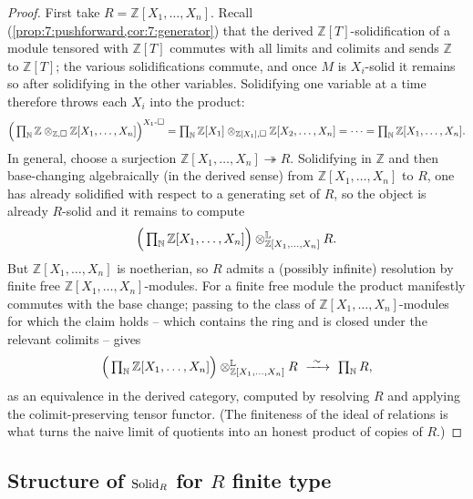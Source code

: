 \begin{proof}
First take $R=\mathbb{Z}[X_{1},\dots,X_{n}]$. Recall (\cref{prop:7:pushforward,cor:7:generator}) that the derived $\mathbb{Z}[T]$-solidification of a module
tensored with $\mathbb{Z}[T]$ commutes with all limits and colimits and sends
$\mathbb{Z}$ to $\mathbb{Z}[T]$; the various solidifications commute, and once
$M$ is $X_{i}$-solid it remains so after solidifying in the other variables.
Solidifying one variable at a time therefore throws each $X_{i}$ into the
product:
\begin{equation*}
\Bigl(\,\textstyle\prod_{\mathbb{N}}\mathbb{Z}\otimes_{\mathbb{Z},\square}
\mathbb{Z}[X_{1},\dots,X_{n}]\Bigr)^{X_{1}\text{-}\square}
=\textstyle\prod_{\mathbb{N}}\mathbb{Z}[X_{1}]\otimes_{\mathbb{Z}[X_{1}],\square}
\mathbb{Z}[X_{2},\dots,X_{n}]=\cdots=\textstyle\prod_{\mathbb{N}}\mathbb{Z}
[X_{1},\dots,X_{n}].
\end{equation*}
In general, choose a surjection $\mathbb{Z}[X_{1},\dots,X_{n}]\twoheadrightarrow
R$. Solidifying in $\mathbb{Z}$ and then base-changing algebraically (in the
derived sense) from $\mathbb{Z}[X_{1},\dots,X_{n}]$ to $R$, one has already
solidified with respect to a generating set of $R$, so the object is already
$R$-solid and it remains to compute
\begin{equation*}
\Bigl(\,\textstyle\prod_{\mathbb{N}}\mathbb{Z}[X_{1},\dots,X_{n}]\Bigr)\otimes^{
\mathbb{L}}_{\mathbb{Z}[X_{1},\dots,X_{n}]}R.
\end{equation*}
But $\mathbb{Z}[X_{1},\dots,X_{n}]$ is noetherian, so $R$ admits a (possibly
infinite) resolution by finite free $\mathbb{Z}[X_{1},\dots,X_{n}]$-modules.
For a finite free module the product manifestly commutes with the base change;
passing to the class of $\mathbb{Z}[X_{1},\dots,X_{n}]$-modules for which the
claim holds -- which contains the ring and is closed under the relevant
colimits -- gives
\begin{equation*}
\Bigl(\,\textstyle\prod_{\mathbb{N}}\mathbb{Z}[X_{1},\dots,X_{n}]\Bigr)\otimes^{
\mathbb{L}}_{\mathbb{Z}[X_{1},\dots,X_{n}]}R\ \xrightarrow{\ \sim\ }\
\textstyle\prod_{\mathbb{N}}R,
\end{equation*}
as an equivalence in the derived category, computed by resolving $R$ and
applying the colimit-preserving tensor functor. (The finiteness of the ideal
of relations is what turns the naive limit of quotients into an honest product
of copies of $R$.)
\end{proof}

\subsection{Structure of \texorpdfstring{$\mathrm{Solid}_{R}$}{Solid\_R} for \texorpdfstring{$R$}{R} finite type}

